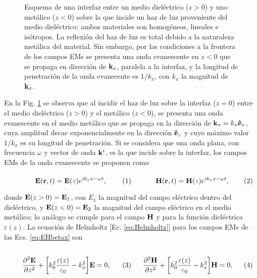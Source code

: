 \begin{figure}[h!]
	\caption{ Esquema de una interfaz entre un medio dieléctrico ($z>0$) y uno metálico ($z<0$) sobre la que incide un haz de luz proveniente del medio dieléctrico; ambos  materiales son homogéneos, lineales e isótropos. La reflexión del haz de luz es total debido a la naturaleza metálica del material. Sin embargo, por las condiciones a la frontera de los campos EMs se presenta una onda evanescente en $z<0$ que se propaga en dirección de $\vb{k}_x$, paralela a la interfaz, y la longitud de penetración de la onda evanecente es $1/k_x$, con $k_x$ la magnitud de $\vb{k}_x$. }\label{fig:SPP}
	\end{figure}
	
En la Fig. \ref{fig:SPP} se observa que al incidir el haz de luz sobre la interfaz ($z=0$)  entre el medio dieléctrico ($z>0$) y el metálico ($z<0$), se presenta una onda evanescente en el medio metálico que se propaga en la dirección de $\vb{k}_x=k_x\vu{e}_x$, cuya amplitud decae exponencialmente en la dirección $\vu{e}_z$ y cuyo máximo valor $1/k_x$ es su longitud de penetración. Si se considera que una onda plana, con frecuencia $\omega$ y vector de onda $\vb{k}^i$, es la que incide sobre la interfaz, los campos EMs de la onda evanescente se proponen como 

	\begin{subequations}\eqhalf{	\vb{E}(\vb{r},t) = \vb{E}(z)e^{ik_x x-\omega t },}
	\eqhalf{\vb{H}(\vb{r},t) = \vb{H}(z)e^{ik_x x-\omega t},}
	\label{eq:EHbetax}\end{subequations} \vspace*{-1em}
	
\noindent donde $\vb{E}(z>0)=\vb{E}_1$, con $E_1$ la magnitud del campo eléctrico dentro del dieléctrico, y $\vb{E}(z<0)=\vb{E}_2$ la magnitud del campo eléctrico en el medio metálico; lo análogo se cumple para el campo $\vb{H}$ y para la función dieléctrica $\varepsilon(z)$. La ecuación de Helmholtz [Ec. \eqref{eq:Helmholtz}] para los campos EMs de las Ecs. \eqref{eq:EHbetax} son

	\begin{subequations}
	\eqhalf{	\pdv[2]{\vb{E}}{z} + \qty[k_0^2\frac{\varepsilon(z)}{\varepsilon_0} - k_x^2 ] \vb{E}= 0,\label{eq:helmE}}
	\eqhalf{\pdv[2]{\vb{H}}{z} + \qty[k_0^2\frac{\varepsilon(z)}{\varepsilon_0}  - k_x^2 ] \vb{H}= 0, \label{eq:helmH}}
	\end{subequations} 
	
